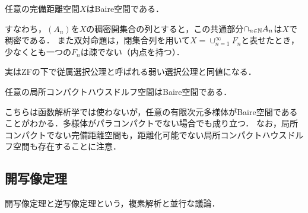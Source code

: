 \documentclass[uplatex,dvipdfmx]{jsreport}
\begin{document}
\begin{proposition}
    任意の完備距離空間$X$はBaire空間である．
    
    すなわち，$(A_n)$を$X$の稠密開集合の列とすると，この共通部分$\cap_{n\in\mathbb{N}}A_n$は$X$で稠密である．
    また双対命題は，閉集合列を用いて$X=\cup_{n=1}^\infty F_n$と表せたとき，少なくとも一つの$F_n$は疎でない（内点を持つ）．
\end{proposition}
\begin{remark}
    実はZFの下で従属選択公理と呼ばれる弱い選択公理と同値になる．
\end{remark}

\begin{proposition}[BCT2]
    任意の局所コンパクトハウスドルフ空間はBaire空間である．
\end{proposition}
\begin{remarks}
    こちらは函数解析学では使わないが，任意の有限次元多様体がBaire空間であることがわかる．多様体がパラコンパクトでない場合でも成り立つ．
    なお，局所コンパクトでない完備距離空間も，距離化可能でない局所コンパクトハウスドルフ空間も存在することに注意．
\end{remarks}

\subsection{開写像定理}

\begin{tcolorbox}[colframe=ForestGreen, colback=ForestGreen!10!white,breakable,colbacktitle=ForestGreen!40!white,coltitle=black,fonttitle=\bfseries\sffamily,
title=]
    開写像定理と逆写像定理という，複素解析と並行な議論．
\end{tcolorbox}
\end{document}
